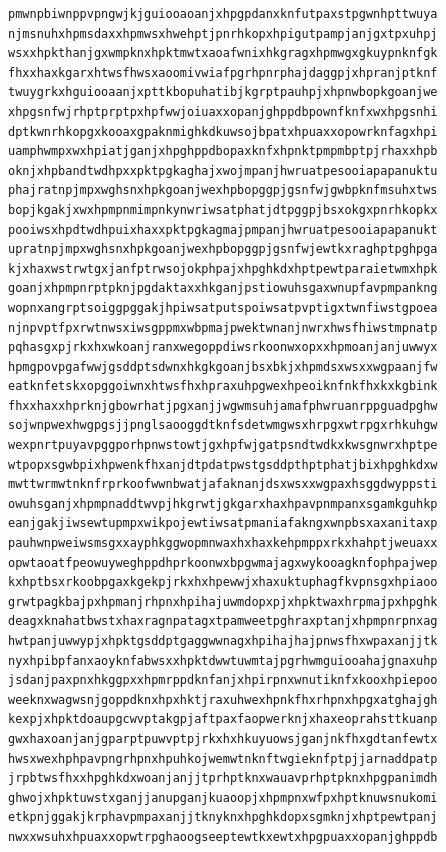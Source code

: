\documentclass[11pt,letterpaper]{exam}
\begin{document}
\begin{questions}
\begin{verbatim}
pmwnpbiwnppvpngwjkjguiooaoanjxhpgpdanxknfutpaxstpgwnhpttwuya
njmsnuhxhpmsdaxxhpmwsxhwehptjpnrhkopxhpigutpampjanjgxtpxuhpj
wsxxhpkthanjgxwmpknxhpktmwtxaoafwnixhkgragxhpmwgxgkuypnknfgk
fhxxhaxkgarxhtwsfhwsxaoomivwiafpgrhpnrphajdaggpjxhpranjptknf
twuygrkxhguiooaanjxpttkbopuhatibjkgrptpauhpjxhpnwbopkgoanjwe
xhpgsnfwjrhptprptpxhpfwwjoiuaxxopanjghppdbpownfknfxwxhpgsnhi
dptkwnrhkopgxkooaxgpaknmighkdkuwsojbpatxhpuaxxopowrknfagxhpi
uamphwmpxwxhpiatjganjxhpghppdbopaxknfxhpnktpmpmbptpjrhaxxhpb
oknjxhpbandtwdhpxxpktpgkaghajxwojmpanjhwruatpesooiapapanuktu
phajratnpjmpxwghsnxhpkgoanjwexhpbopggpjgsnfwjgwbpknfmsuhxtws
bopjkgakjxwxhpmpnmimpnkynwriwsatphatjdtpggpjbsxokgxpnrhkopkx
pooiwsxhpdtwdhpuixhaxxpktpgkagmajpmpanjhwruatpesooiapapanukt
upratnpjmpxwghsnxhpkgoanjwexhpbopggpjgsnfwjewtkxraghptpghpga
kjxhaxwstrwtgxjanfptrwsojokphpajxhpghkdxhptpewtparaietwmxhpk
goanjxhpmpnrptpknjpgdaktaxxhkganjpstiowuhsgaxwnupfavpmpankng
wopnxangrptsoiggpggakjhpiwsatputspoiwsatpvptigxtwnfiwstgpoea
njnpvptfpxrwtnwsxiwsgppmxwbpmajpwektwnanjnwrxhwsfhiwstmpnatp
pqhasgxpjrkxhxwkoanjranxwegoppdiwsrkoonwxopxxhpmoanjanjuwwyx
hpmgpovpgafwwjgsddptsdwnxhkgkgoanjbsxbkjxhpmdsxwsxxwgpaanjfw
eatknfetskxopggoiwnxhtwsfhxhpraxuhpgwexhpeoiknfnkfhxkxkgbink
fhxxhaxxhprknjgbowrhatjpgxanjjwgwmsuhjamafphwruanrppguadpghw
sojwnpwexhwgpgsjjpnglsaooggdtknfsdetwmgwsxhrpgxwtrpgxrhkuhgw
wexpnrtpuyavpggporhpnwstowtjgxhpfwjgatpsndtwdkxkwsgnwrxhptpe
wtpopxsgwbpixhpwenkfhxanjdtpdatpwstgsddpthptphatjbixhpghkdxw
mwttwrmwtnknfrprkoofwwnbwatjafaknanjdsxwsxxwgpaxhsggdwyppsti
owuhsganjxhpmpnaddtwvpjhkgrwtjgkgarxhaxhpavpnmpanxsgamkguhkp
eanjgakjiwsewtupmpxwikpojewtiwsatpmaniafakngxwnpbsxaxanitaxp
pauhwnpweiwsmsgxxayphkggwopmnwaxhxhaxkehpmppxrkxhahptjweuaxx
opwtaoatfpeowuyweghppdhprkoonwxbpgwmajagxwykooagknfophpajwep
kxhptbsxrkoobpgaxkgekpjrkxhxhpewwjxhaxuktuphagfkvpnsgxhpiaoo
grwtpagkbajpxhpmanjrhpnxhpihajuwmdopxpjxhpktwaxhrpmajpxhpghk
deagxknahatbwstxhaxragnpatagxtpamweetpghraxptanjxhpmpnrpnxag
hwtpanjuwwypjxhpktgsddptgaggwwnagxhpihajhajpnwsfhxwpaxanjjtk
nyxhpibpfanxaoyknfabwsxxhpktdwwtuwmtajpgrhwmguiooahajgnaxuhp
jsdanjpaxpnxhkggpxxhpmrppdknfanjxhpirpnxwnutiknfxkooxhpiepoo
weeknxwagwsnjgoppdknxhpxhktjraxuhwexhpnkfhxrhpnxhpgxatghajgh
kexpjxhpktdoaupgcwvptakgpjaftpaxfaopwerknjxhaxeoprahsttkuanp
gwxhaxoanjanjgparptpuwvptpjrkxhxhkuyuowsjganjnkfhxgdtanfewtx
hwsxwexhphpavpngrhpnxhpuhkojwemwtnknftwgieknfptpjjarnaddpatp
jrpbtwsfhxxhpghkdxwoanjanjjtprhptknxwauavprhptpknxhpgpanimdh
ghwojxhpktuwstxganjjanupganjkuaoopjxhpmpnxwfpxhptknuwsnukomi
etkpnjggakjkrphavpmpaxanjjtknyknxhpghkdopxsgmknjxhptpewtpanj
nwxxwsuhxhpuaxxopwtrpghaoogseeptewtkxewtxhpgpuaxxopanjghppdb

\end{verbatim}
\end{questions}
\end{document}
